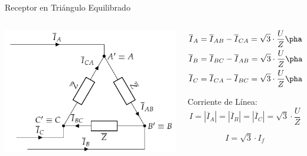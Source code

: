 \documentclass[aspectratio=169, usenames,svgnames,dvipsnames]{beamer}
\begin{document}
\begin{frame}[label={sec:orgef51050}]{Receptor en Triángulo Equilibrado}
\begin{columns}
\begin{column}{0.5\columnwidth}
\begin{center}
\includegraphics[width=.9\linewidth]{../figs/TrianguloEquilibrado_Receptor.pdf}
\end{center}
\end{column}

\begin{column}{0.5\columnwidth}
\begin{align*}
  \overline{I}_A &= \overline{I}_{AB} - \overline{I}_{CA} = \sqrt{3} \cdot \frac{U}{Z}\phase{\ang{\pm 90} - \varphi}\\
  \overline{I}_B &= \overline{I}_{BC} - \overline{I}_{AB} = \sqrt{3} \cdot \frac{U}{Z}\phase{\ang{\mp 30} - \varphi}\\
  \overline{I}_C &= \overline{I}_{CA} - \overline{I}_{BC} = \sqrt{3} \cdot \frac{U}{Z}\phase{\ang{\mp 150} - \varphi}\\
\end{align*}

Corriente de Línea:
\[
  \boxed{I = |\overline{I}_A| = |\overline{I}_B| = |\overline{I}_C| = \sqrt{3} \cdot \frac{U}{Z}}
\]

\[
  \boxed{I = \sqrt{3} \cdot I_f}
\]
\end{column}
\end{columns}
\end{frame}
\end{document}
